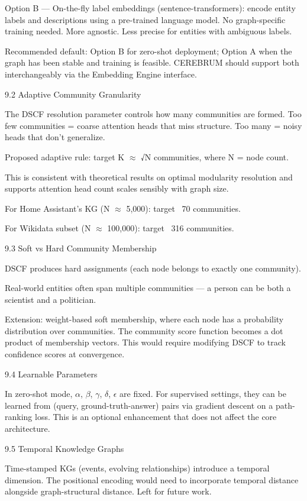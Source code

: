 \documentclass[10pt,journal,compsoc]{IEEEtran}
\begin{document}
Option B — On-the-fly label embeddings (sentence-trans\-formers): encode entity labels and descr\-iptions using a pre-trained language model. No graph-specific training needed. More agnostic. Less precise for entities with ambiguous labels.

Recommended default: Option B for zero-shot deployment; Option A when the graph has been stable and training is feasible. CEREBRUM should support both inter\-changeably via the Embedding Engine interface.

9.2 Adaptive Community Granularity

The DSCF resolution parameter controls how many communities are formed. Too few communities = coarse attention heads that miss structure. Too many = noisy heads that don't generalize.

Proposed adaptive rule: target K $\approx$ √N communities, where N = node count.

This is consistent with theoretical results on optimal modularity resolution and supports attention head count scales sensibly with graph size.

For Home Assistant's KG (N $\approx$ 5,000): target ~70 communities.

For Wikidata subset (N $\approx$ 100,000): target ~316 communities.

9.3 Soft vs Hard Community Membership

DSCF produces hard assignments (each node belongs to exactly one community).

Real-world entities often span multiple communities — a person can be both a scientist and a politician.

Extension: weight-based soft membership, where each node has a probability distr\-ibution over communities. The community score function becomes a dot product of membership vectors. This would require modifying DSCF to track confidence scores at convergence.

9.4 Learnable Parameters

In zero-shot mode, $\alpha$, $\beta$, $\gamma$, $\delta$, $\epsilon$ are fixed. For supervised settings, they can be learned from (query, ground-truth-answer) pairs via gradient descent on a path-ranking loss. This is an optional enhancement that does not affect the core archi\-tecture.

9.5 Temporal Knowledge Graphs

Time-stamped KGs (events, evolving relat\-ionships) introduce a temporal dimension. The positional encoding would need to incorporate temporal distance alongside graph-structural distance. Left for future work.
\end{document}
